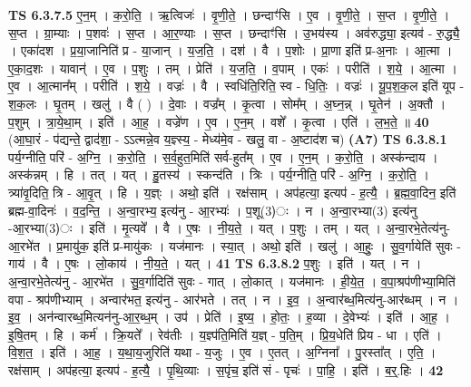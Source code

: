 \documentclass[17pt]{extarticle}
\begin{document}
                  \newline
                                \textbf{ TS 6.3.7.5} \newline
                  ए॒न॒म् । क॒रो॒ति॒ । ऋ॒त्विजः॑ । वृ॒णी॒ते॒ । छन्दाꣳ॑सि । ए॒व । वृ॒णी॒ते॒ । स॒प्त । वृ॒णी॒ते॒ । स॒प्त । ग्रा॒म्याः । प॒शवः॑ । स॒प्त । आ॒र॒ण्याः । स॒प्त । छन्दाꣳ॑सि । उ॒भय॑स्य । अव॑रुद्ध्या॒ इत्यव॑ - रु॒द्ध्यै॒ । एका॑दश । प्र॒या॒जानिति॑ प्र - या॒जान् । य॒ज॒ति॒ । दश॑ । वै । प॒शोः । प्रा॒णा इति॑ प्र-अ॒नाः । आ॒त्मा । ए॒का॒द॒शः । यावान्॑ । ए॒व । प॒शुः । तम् । प्रेति॑ । य॒ज॒ति॒ । व॒पाम् । एकः॑ । परीति॑ । श॒ये॒ । आ॒त्मा । ए॒व । आ॒त्मान᳚म् । परीति॑ । श॒ये॒ । वज्रः॑ । वै । स्वधि॑ति॒रिति॒ स्व - धि॒तिः॒ । वज्रः॑ । यू॒प॒श॒क॒ल इति॑ यूप - श॒क॒लः । घृ॒तम् । खलु॑ । वै ( ) । दे॒वाः । वज्र᳚म् । कृ॒त्वा । सोम᳚म् । अ॒घ्न॒न्न् । घृ॒तेन॑ । अ॒क्तौ । प॒शुम् । त्रा॒ये॒था॒म् । इति॑ । आ॒ह॒ । वज्रे॑ण । ए॒व । ए॒न॒म् । वशे᳚ । कृ॒त्वा । एति॑ । ल॒भ॒ते॒ ॥ \textbf{  40} \newline
                  \newline
                      (आ॒घा॒रं - प॑द्यन्ते॒ द्वाद॑शा॒ - ऽऽत्मन्ने॒व य॒ज्ञ्स्य॒ - मेध्य॑मे॒व - खलु॒ वा - अ॒ष्टाद॑श च)  \textbf{(A7)} \newline \newline
                                \textbf{ TS 6.3.8.1} \newline
                  पर्य॒ग्नीति॒ परि॑ - अ॒ग्नि॒ । क॒रो॒ति॒ । स॒र्व॒हुत॒मिति॑ सर्व-हुत᳚म् । ए॒व । ए॒न॒म् । क॒रो॒ति॒ । अस्क॑न्दाय । अस्क॑न्नम् । हि । तत् । यत् । हु॒तस्य॑ । स्कन्द॑ति । त्रिः । पर्य॒ग्नीति॒ परि॑ - अ॒ग्नि॒ । क॒रो॒ति॒ । त्र्या॑वृ॒दिति॒ त्रि - आ॒वृ॒त् । हि । य॒ज्ञ्ः । अथो॒ इति॑ । रक्ष॑साम् । अप॑हत्या॒ इत्यप॑ - ह॒त्यै॒ । ब्र॒ह्म॒वा॒दिन॒ इति॑ ब्रह्म-वा॒दिनः॑ । व॒द॒न्ति॒ । अ॒न्वा॒रभ्य॒ इत्य॑नु - आ॒रभ्यः॑ । प॒शू(3)ः । न । अ॒न्वा॒रभ्या(3) इत्य॑नु -आ॒रभ्या(3)ः । इति॑ । मृ॒त्यवे᳚ । वै । ए॒षः । नी॒य॒ते॒ । यत् ।  प॒शुः । तम् । यत् । अ॒न्वा॒रभे॒तेत्य॑नु-आ॒रभे॑त । प्र॒मायु॑क॒ इति॑ प्र-मायु॑कः । यज॑मानः । स्या॒त् । अथो॒ इति॑ । खलु॑ । आ॒हुः॒ । सु॒व॒र्गायेति॑ सुवः - गाय॑ । वै । ए॒षः । लो॒काय॑ । नी॒य॒ते॒ । यत् । \textbf{  41} \newline
                  \newline
                                \textbf{ TS 6.3.8.2} \newline
                  प॒शुः । इति॑ । यत् । न । अ॒न्वा॒रभे॒तेत्य॑नु - आ॒रभे॑त । सु॒व॒र्गादिति॑ सुवः - गात् । लो॒कात् । यज॑मानः । ही॒ये॒त॒ । व॒पा॒श्रप॑णीभ्या॒मिति॑ वपा - श्रप॑णीभ्याम् । अन्वार॑भत॒ इत्य॑नु - आर॑भते । तत् । न । इ॒व॒ । अ॒न्वार॑ब्ध॒मित्य॑नु-आर॑ब्धम् । न । इ॒व॒ । अन॑न्वारब्ध॒मित्यन॑नु-आ॒र॒ब्ध॒म् । उप॑ । प्रेति॑ । इ॒ष्य॒ । हो॒तः॒ । ह॒व्या । दे॒वेभ्यः॑ । इति॑ । आ॒ह॒ । इ॒षि॒तम् । हि । कर्म॑ । क्रि॒यते᳚ । रेव॑तीः । य॒ज्ञ्प॑ति॒मिति॑ य॒ज्ञ् - प॒ति॒म् । प्रि॒य॒धेति॑ प्रिय - धा । एति॑ । वि॒श॒त॒ । इति॑ । आ॒ह॒ । य॒था॒य॒जुरिति॑ यथा - य॒जुः । ए॒व । ए॒तत् । अ॒ग्निना᳚ । पु॒रस्ता᳚त् । ए॒ति॒ । रक्ष॑साम् । अप॑हत्या॒ इत्यप॑ - ह॒त्यै॒ । पृ॒थि॒व्याः । स॒पृंच॒ इति॑ सं - पृचः॑ । पा॒हि॒ । इति॑ । ब॒र्॒.हिः । \textbf{  42} \newline
\end{document}
